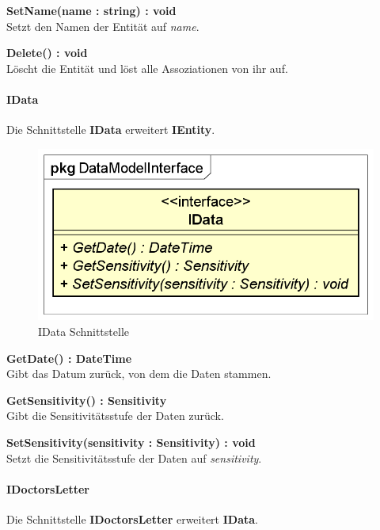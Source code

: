 \documentclass[a4paper]{scrreprt}
\begin{document}
\textbf{SetName(name : string) : void}\\
Setzt den Namen der Entität auf \textit{name}.

\textbf{Delete() : void}\\
Löscht die Entität und löst alle Assoziationen von ihr auf.

\paragraph{IData}
Die Schnittstelle \textbf{IData} erweitert \textbf{IEntity}.

\begin{figure}[H]
\centering
\includegraphics[width=0.45\textheight]{graphics/Klassendiagramme/Model/IData.png}
\caption{IData Schnittstelle}
\end{figure}
\textbf{GetDate() : DateTime}\\
Gibt das Datum zurück, von dem die Daten stammen.

\textbf{GetSensitivity() : Sensitivity}\\
Gibt die Sensitivitätsstufe der Daten zurück.

\textbf{SetSensitivity(sensitivity : Sensitivity) : void}\\
Setzt die Sensitivitätsstufe der Daten auf \textit{sensitivity}.

\paragraph{IDoctorsLetter}
Die Schnittstelle \textbf{IDoctorsLetter} erweitert \textbf{IData}.
\end{document}

